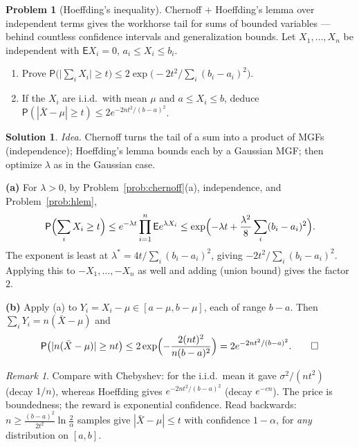 \documentclass[14pt]{extarticle}
\theoremstyle{definition}
\newtheorem{exercise}{Problem}
\newtheorem*{solution}{Solution}
\theoremstyle{remark}
\newtheorem*{remark}{Remark}
\newcommand\expc{\mathsf{E}}
\newcommand\prb{\mathsf{P}}
\begin{document}
\begin{exercise}[Hoeffding's inequality]\label{prob:hoeff}
Chernoff $+$ Hoeffding's lemma over independent terms gives the workhorse tail for sums of bounded variables --- behind countless confidence intervals and generalization bounds. Let $X_1,\ldots,X_n$ be independent with $\expc X_i=0$, $a_i\le X_i\le b_i$.
\begin{enumerate}[label=(\alph*)]
\item Prove $\prb\bigl(\bigl|\sum_iX_i\bigr|\ge t\bigr)\le2\exp\bigl(-2t^2/\sum_i(b_i-a_i)^2\bigr)$.
\item If the $X_i$ are i.i.d.\ with mean $\mu$ and $a\le X_i\le b$, deduce $\prb(|\bar X-\mu|\ge t)\le2e^{-2nt^2/(b-a)^2}$.
\end{enumerate}
\end{exercise}
\begin{solution}
\emph{Idea.} Chernoff turns the tail of a sum into a product of MGFs (independence); Hoeffding's lemma bounds each by a Gaussian MGF; then optimize $\lambda$ as in the Gaussian case.

\textbf{(a)} For $\lambda>0$, by Problem~\ref{prob:chernoff}(a), independence, and Problem~\ref{prob:hlem},
\[
\prb\Bigl(\sum_iX_i\ge t\Bigr)\le e^{-\lambda t}\prod_{i=1}^n\expc e^{\lambda X_i}\le\exp\Bigl(-\lambda t+\frac{\lambda^2}8\sum_i(b_i-a_i)^2\Bigr).
\]
The exponent is least at $\lambda^*=4t/\sum_i(b_i-a_i)^2$, giving $-2t^2/\sum_i(b_i-a_i)^2$. Applying this to $-X_1,\ldots,-X_n$ as well and adding (union bound) gives the factor $2$.

\textbf{(b)} Apply (a) to $Y_i=X_i-\mu\in[a-\mu,b-\mu]$, each of range $b-a$. Then $\sum_iY_i=n(\bar X-\mu)$ and
\[
\prb\bigl(|n(\bar X-\mu)|\ge nt\bigr)\le2\exp\Bigl(-\frac{2(nt)^2}{n(b-a)^2}\Bigr)=2e^{-2nt^2/(b-a)^2}.\qedhere
\]
\end{solution}
\begin{remark}
Compare with Chebyshev: for the i.i.d.\ mean it gave $\sigma^2/(nt^2)$ (decay $1/n$), whereas Hoeffding gives $e^{-2nt^2/(b-a)^2}$ (decay $e^{-cn}$). The price is boundedness; the reward is exponential confidence. Read backwards: $n\ge\tfrac{(b-a)^2}{2t^2}\ln\tfrac2\alpha$ samples give $|\bar X-\mu|\le t$ with confidence $1-\alpha$, for \emph{any} distribution on $[a,b]$.
\end{remark}
\end{document}
